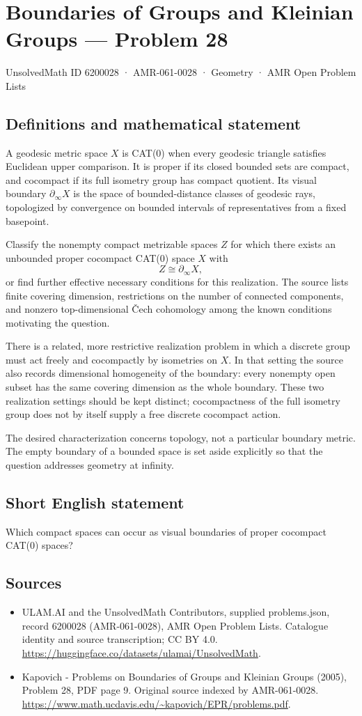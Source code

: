 \documentclass[11pt,a4paper]{article}
\begin{document}
\section*{Boundaries of Groups and Kleinian Groups — Problem 28}\label{6200028}
{\small UnsolvedMath ID 6200028 · AMR-061-0028 · Geometry · AMR Open Problem Lists}
\subsection{Definitions and mathematical statement}
A geodesic metric space $X$ is CAT(0) when every geodesic triangle satisfies Euclidean upper comparison. It is proper if its closed bounded sets are compact, and cocompact if its full isometry group has compact quotient. Its visual boundary $\partial_\infty X$ is the space of bounded-distance classes of geodesic rays, topologized by convergence on bounded intervals of representatives from a fixed basepoint.

Classify the nonempty compact metrizable spaces $Z$ for which there exists an unbounded proper cocompact CAT(0) space $X$ with
\[
 Z\cong\partial_\infty X,
\]
or find further effective necessary conditions for this realization. The source lists finite covering dimension, restrictions on the number of connected components, and nonzero top-dimensional \v{C}ech cohomology among the known conditions motivating the question.

There is a related, more restrictive realization problem in which a discrete group must act freely and cocompactly by isometries on $X$. In that setting the source also records dimensional homogeneity of the boundary: every nonempty open subset has the same covering dimension as the whole boundary. These two realization settings should be kept distinct; cocompactness of the full isometry group does not by itself supply a free discrete cocompact action.

The desired characterization concerns topology, not a particular boundary metric. The empty boundary of a bounded space is set aside explicitly so that the question addresses geometry at infinity.
\subsection{Short English statement}
Which compact spaces can occur as visual boundaries of proper cocompact CAT(0) spaces?
\subsection{Sources}
\begin{itemize}
\item[S1] ULAM.AI and the UnsolvedMath Contributors, supplied problems.json, record 6200028 (AMR-061-0028), AMR Open Problem Lists. Catalogue identity and source transcription; CC BY 4.0.
\url{https://huggingface.co/datasets/ulamai/UnsolvedMath}.
\item[S2] Kapovich - Problems on Boundaries of Groups and Kleinian Groups (2005), Problem 28, PDF page 9. Original source indexed by AMR-061-0028.
\url{https://www.math.ucdavis.edu/~kapovich/EPR/problems.pdf}.
\end{itemize}
\end{document}
